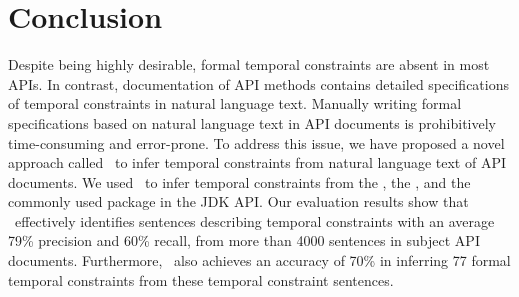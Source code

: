 \section{Conclusion}
\label{sec:conclusion}
\vspace*{-1ex}
Despite being highly desirable, formal temporal constraints are absent in most APIs.
In contrast, documentation of API methods contains detailed specifications of temporal constraints in natural language text.
Manually writing formal specifications based on natural language text in API documents is prohibitively time-consuming and error-prone.
To address this issue, we have proposed a novel approach called \tool\ to infer temporal constraints from natural language text of API documents.
We used \tool\ to infer temporal constraints from
the \paypalAPI, the \amazonAPI, and the 
commonly used package  in the JDK API.
Our evaluation results show that \tool\ effectively identifies sentences describing
temporal constraints with an average 79\% precision and 60\% recall,
from more than 4000 sentences in subject API documents.
Furthermore, \tool\ also achieves an accuracy of
70\% in inferring 77 formal temporal constraints from these temporal constraint sentences.
